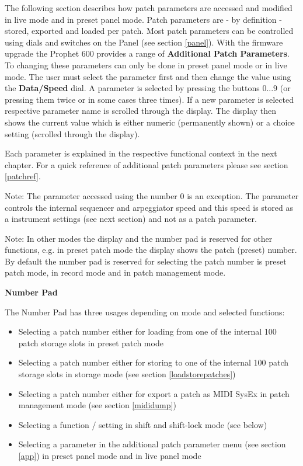 \documentclass[landscape, 11pt, oneside]{report}
\newenvironment{flowtext}{\addmargin[0cm]{7cm}}{\endaddmargin} %
\begin{document}
\begin{flowtext}
The following section describes how patch parameters are accessed and modified in live mode and in preset panel mode. Patch parameters are - by definition - stored, exported and loaded per patch. Most patch parameters can be controlled using dials and switches on the Panel (see section \ref{panel}). With the firmware upgrade the Prophet 600 provides a range of \textbf{Additional Patch Parameters}. To changing these parameters can only be done in preset panel mode or in live mode. The user must select the parameter first and then change the value using the \textbf{Data/Speed} dial. A parameter is selected by pressing the buttons 0...9 (or pressing them twice or in some cases three times). If a new parameter is selected respective parameter name is scrolled through the display. The display then shows the current value which is either numeric (permanently shown) or a choice setting (scrolled through the display). 

Each parameter is explained in the respective functional context in the next chapter. For a quick reference of additional patch parameters please see section \ref{patchref}. 

Note: The parameter accessed using the number 0 is an exception. The parameter controls the internal sequencer and arpeggiator speed and this speed is stored as a instrument settings (see next section) and not as a patch parameter. 

Note: In other modes the display and the number pad is reserved for other functions, e.g. in preset patch mode the display shows the patch (preset) number. By default the number pad is reserved for selecting the patch number is preset patch mode, in record mode and in patch management mode.

\textbf{Number Pad}

The Number Pad has three usages depending on mode and selected functions:

\begin{itemize}
  \item Selecting a patch number either for loading from one of the internal 100 patch storage slots in preset patch mode
  \item Selecting a patch number either for storing to one of the internal 100 patch storage slots in storage mode (see section \ref{loadstorepatches})
  \item Selecting a patch number either for export a patch as MIDI SysEx in patch management mode (see section \ref{mididump})
  \item Selecting a function / setting in shift and shift-lock mode (see below)  
  \item Selecting a parameter in the additional patch parameter menu (see section \ref{app}) in preset panel mode and in live panel mode
\end{itemize} 


\end{flowtext}
\end{document}
